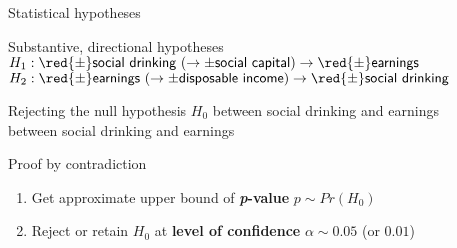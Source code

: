 \documentclass[t]{beamer}
\begin{document}
	\begin{frame}[t]{Statistical hypotheses}
		
		\begin{block}{Substantive, directional hypotheses}
			$H_1: \red{\pm} \textsf{social drinking}~(\rightarrow \pm\textsf{social capital}) \rightarrow \red{\pm} \textsf{earnings}$\\
			$H_2: \red{\pm} \textsf{earnings}~(\rightarrow \pm\textsf{disposable income}) \rightarrow \red{\pm} \textsf{social drinking}$\\
		\end{block}

		\begin{block}{Rejecting the null hypothesis $H_0$}
			  between social drinking and earnings\\
			  between social drinking and earnings\\[.5em]
		\end{block}
		
		\begin{alertblock}{Proof by contradiction}
			
			\begin{enumerate}
				\item Get approximate upper bound of \textbf{\emph{p}-value} %
					$p \sim Pr(H_0)$
				\item Reject or retain $H_0$ at %
					\textbf{level of confidence} $\alpha \sim 0.05$ (or $0.01$)
			\end{enumerate}
			
		\end{alertblock}
		
	\end{frame}

	
\end{document}

